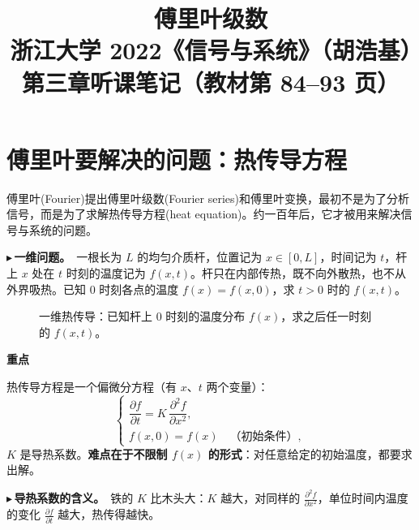 \documentclass[UTF8,a4paper,11pt]{ctexart}
\title{傅里叶级数\\\large 浙江大学 2022《信号与系统》（胡浩基）第三章听课笔记（教材第 84--93 页）}
\author{}
\date{}
\newenvironment{remember}{\begin{rememberbox}\textbf{重点}\par\smallskip}{\end{rememberbox}}
\newcommand{\taxes}[5][t]{%
  \draw[->] (#2,0) -- (#3,0) node[right,font=\scriptsize] {$#1$};
  \draw[->] (0,#5) -- (0,#4);
  \node[anchor=north east,font=\tiny,gray!60!black,inner sep=1pt] at (0,-0.02) {$0$};}
\newcommand{\xt}[2]{\draw (#1,0) -- (#1,-0.1) node[anchor=north,font=\tiny,gray!60!black,fill=white,inner sep=0.6pt] {$#2$};}
\newcounter{ex}[section]
\newcommand{\point}[1]{\par\addvspace{1ex}\noindent\textcolor{ptteal}{$\blacktriangleright$\,\textbf{#1}}\ }
\begin{document}
\pagestyle{plain}
\maketitle

\section{傅里叶要解决的问题：热传导方程}\label{sec:heat}
傅里叶(Fourier)提出傅里叶级数(Fourier series)和傅里叶变换，最初不是为了分析信号，而是为了求解热传导方程(heat equation)。约一百年后，它才被用来解决信号与系统的问题。

\point{一维问题。}一根长为 $L$ 的均匀介质杆，位置记为 $x\in[0,L]$，时间记为 $t$，杆上 $x$ 处在 $t$ 时刻的温度记为 $f(x,t)$。杆只在内部传热，既不向外散热，也不从外界吸热。已知 $0$ 时刻各点的温度 $f(x)=f(x,0)$，求 $t>0$ 时的 $f(x,t)$。

\begin{figure}[H]
\centering
{}
\caption{一维热传导：已知杆上 $0$ 时刻的温度分布 $f(x)$，求之后任一时刻的 $f(x,t)$。}
\end{figure}

\begin{remember}
热传导方程是一个偏微分方程（有 $x$、$t$ 两个变量）：
\[
\begin{cases}
\dfrac{\partial f}{\partial t}=K\,\dfrac{\partial^2 f}{\partial x^2},\\[2ex]
f(x,0)=f(x)\quad\text{（初始条件）},
\end{cases}
\]
$K$ 是导热系数。\textbf{难点在于不限制 $f(x)$ 的形式}：对任意给定的初始温度，都要求出解。
\end{remember}

\point{导热系数的含义。}铁的 $K$ 比木头大：$K$ 越大，对同样的 $\frac{\partial^2 f}{\partial x^2}$，单位时间内温度的变化 $\frac{\partial f}{\partial t}$ 越大，热传得越快。
\end{document}
